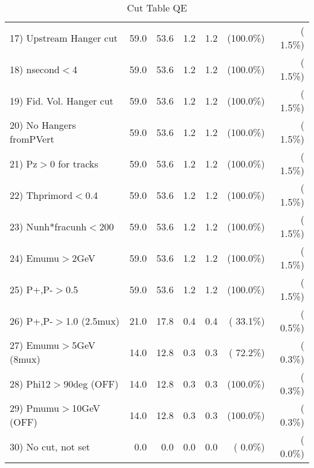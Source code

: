 \begin{table}[h!]
\begin{tabular}{||l||r|r|r|r|r|r||}
 17) Upstream Hanger cut  &         59.0 &         53.6 &          1.2 &          1.2 & (100.0\%) & (  1.5\%) \\
 18) nsecond$<$4          &         59.0 &         53.6 &          1.2 &          1.2 & (100.0\%) & (  1.5\%) \\
 19) Fid. Vol. Hanger cut &         59.0 &         53.6 &          1.2 &          1.2 & (100.0\%) & (  1.5\%) \\
 20) No Hangers fromPVert &         59.0 &         53.6 &          1.2 &          1.2 & (100.0\%) & (  1.5\%) \\
 21) Pz$>$0 for tracks    &         59.0 &         53.6 &          1.2 &          1.2 & (100.0\%) & (  1.5\%) \\
 22) Thprimord$<$0.4      &         59.0 &         53.6 &          1.2 &          1.2 & (100.0\%) & (  1.5\%) \\
 23) Nunh*fracunh$<$200   &         59.0 &         53.6 &          1.2 &          1.2 & (100.0\%) & (  1.5\%) \\
 24) Emumu$>$2GeV         &         59.0 &         53.6 &          1.2 &          1.2 & (100.0\%) & (  1.5\%) \\
 25) P+,P-$>$0.5          &         59.0 &         53.6 &          1.2 &          1.2 & (100.0\%) & (  1.5\%) \\
 26) P+,P-$>$1.0 (2.5mux) &         21.0 &         17.8 &          0.4 &          0.4 & ( 33.1\%) & (  0.5\%) \\
 27) Emumu$>$5GeV  (8mux) &         14.0 &         12.8 &          0.3 &          0.3 & ( 72.2\%) & (  0.3\%) \\
 28) Phi12$>$90deg  (OFF) &         14.0 &         12.8 &          0.3 &          0.3 & (100.0\%) & (  0.3\%) \\
 29) Pmumu$>$10GeV  (OFF) &         14.0 &         12.8 &          0.3 &          0.3 & (100.0\%) & (  0.3\%) \\
 30) No cut, not set      &          0.0 &          0.0 &          0.0 &          0.0 & (  0.0\%) & (  0.0\%) \\
 \hline
 \hline
 \end{tabular}
 \caption{Cut Table  QE       }
 \label{tab-cutheavy_neutrino_0.250}
 \end{table}
